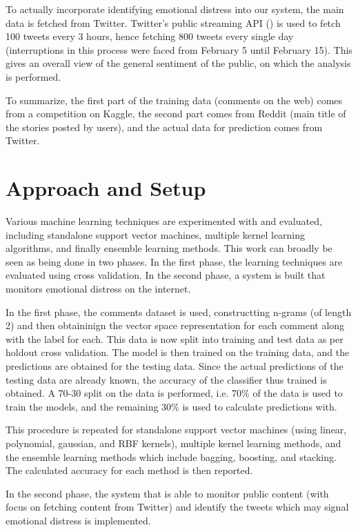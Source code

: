 To actually incorporate identifying emotional distress into our system, the main data is fetched from Twitter. Twitter's public streaming API (\cite{twitter_streaming_api}) is used to fetch 100 tweets every 3 hours, hence fetching 800 tweets every single day (interruptions in this process were faced from February 5 until February 15). This gives an overall view of the general sentiment of the public, on which the analysis is performed.

To summarize, the first part of the training data (comments on the web) comes from a competition on Kaggle, the second part comes from Reddit (main title of the stories posted by users), and the actual data for prediction comes from Twitter.

\section{Approach and Setup}
Various machine learning techniques are experimented with and evaluated, including standalone support vector machines, multiple kernel learning algorithms, and finally ensemble learning methods. This work can broadly be seen as being done in two phases. In the first phase, the learning techniques are evaluated using cross validation. In the second phase, a system is built that monitors emotional distress on the internet.

In the first phase, the comments \cite{kaggle} dataset is used, constructting n-grams (of length 2) and then obtaininign the vector space representation for each comment along with the label for each. This data is now split into training and test data as per holdout cross validation. The model is then trained on the training data, and the predictions are obtained for the testing data. Since the actual predictions of the testing data are already known, the accuracy of the classifier thus trained is obtained. A 70-30 split on the data is performed, i.e. 70\% of the data is used to train the models, and the remaining 30\% is used to calculate predictions with.

This procedure is repeated for standalone support vector machines (using linear, polynomial, gaussian, and RBF kernels), multiple kernel learning methods, and the ensemble learning methods which include bagging, boosting, and stacking. The calculated accuracy for each method is then reported.

In the second phase, the system that is able to monitor public content (with focus on fetching content from Twitter) and identify the tweets which may signal emotional distress is implemented.


